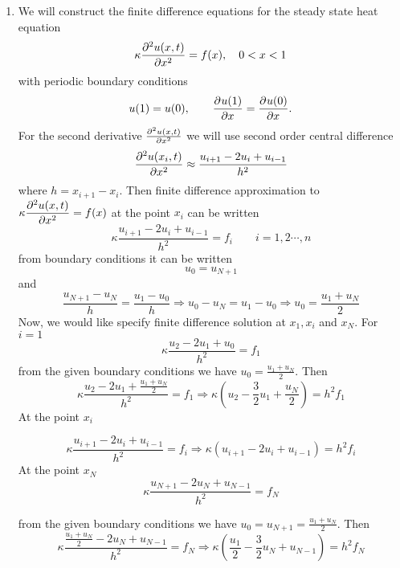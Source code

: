 \begin{solution}
\begin{enumerate}

\item We will construct the finite difference equations for the steady state heat equation 
\[
\kappa\frac{\partial^{2} u(x,t)}{\partial x^{2}} = f(x), \quad 0 < x < 1
\]
with periodic boundary conditions
\[
u(1) = u(0), \qquad \frac{\partial^{} u(1)}{\partial x^{}} = \frac{\partial^{} u(0)}{\partial x^{}}.
\]
For the second derivative $\frac{\partial^{2} u(x,t)}{\partial x^{2}}$ we will use second order central difference 
\[
\frac{\partial^{2} u(x_i,t)}{\partial x^{2}} \approx \frac{u_{i+1}- 2u_i + u_{i-1} } {h^2}
\]
where $h= x_{i+1}-x_i$. Then finite difference approximation to $ \displaystyle{\kappa\frac{\partial^{2} u(x,t)}{\partial x^{2}} = f(x)}$ at the point $x_i$ can be written
\[
\kappa \frac{u_{i+1}- 2u_i + u_{i-1} } {h^2} = f_i \qquad i=1,2 \cdots, n
\]
from boundary conditions it can be written 
\[
u_0 = u_{N+1}
\]
and 
\[
\frac{u_{N+1} - u_N }{h}= \frac{u_{1} - u_0 }{h} \Rightarrow u_{0} - u_N =u_{1} - u_0  \Rightarrow u_0 =\frac{u_1 +u_N}{2}
\]
Now, we would like specify finite difference solution at $x_1, x_i$ and $x_N$. For $i=1$
\[
\kappa \frac{u_{2}- 2u_1 + u_{0} } {h^2} = f_1  
\]
from the given boundary conditions we have $u_0= \frac{u_1 + u_N}{2}$. Then
\[
 \kappa \frac{u_{2}- 2u_1 + \frac{u_1 +u_N}{2}}{h^2} = f_1 \Rightarrow  \kappa( u_{2}- \frac{3}{2} u_1 + \frac{u_N}{2}) = h^2f_1
\]
At the point $x_i$ 

\[
\kappa \frac{u_{i+1}- 2u_i + u_{i-1} } {h^2} = f_i \Rightarrow \kappa (u_{i+1}- 2u_i + u_{i-1}) = h^2 f_i
\]
At the point $x_N$ 
\[
\kappa \frac{u_{N+1}- 2u_N + u_{N-1} } {h^2} = f_N 
\]

from the given boundary conditions we have $u_0=u_{N+1}= \frac{u_1 +u_N}{2}$. Then
\[
\kappa \frac{\frac{u_1 +u_N}{2}- 2u_N + u_{N-1} } {h^2} = f_N \Rightarrow \kappa( \frac{u_{1}}{2}- \frac{3}{2}u_N + u_{N-1}) = h^2f_N
\]


\end{enumerate}
\end{solution}
